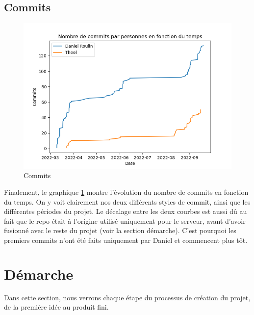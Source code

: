 \documentclass[a4paper]{article}
\begin{document}
\subsection{Commits}
\begin{figure}[h]
    \centering
    \includegraphics[width=\textwidth]{images/stats/commits.png}
    \caption{Commits}
    \label{fig:commits}
\end{figure}
Finalement, le graphique \ref{fig:commits} montre l'évolution du nombre de commits en fonction du temps. On y voit clairement nos deux différents styles de commit, ainsi que les différentes périodes du projet. Le décalage entre les deux courbes est aussi dû au fait que le repo était à l’origine utilisé uniquement pour le serveur, avant d’avoir fusionné avec le reste du projet (voir la section démarche). C’est pourquoi les premiers commits n’ont été faits uniquement par Daniel et commencent plus tôt.

\newpage

\section{Démarche}
\label{section:demarche}
Dans cette section, nous verrons chaque étape du processus de création  du projet, de la première idée au produit fini. 
\end{document}
